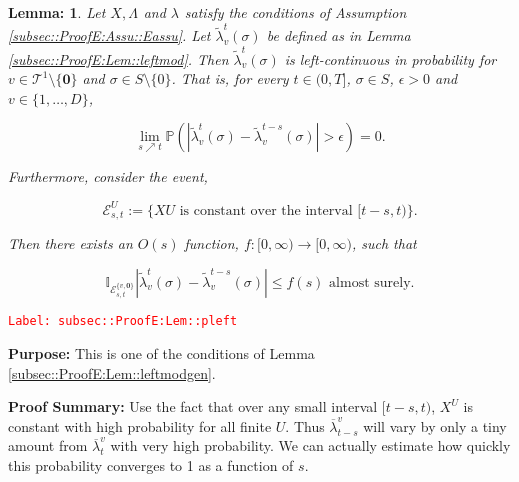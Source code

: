 \documentclass[12pt]{article}
\newcommand{\mb}{\mathbb}
\newcommand{\mc}{\mathcal}
\newcommand{\ra}{\rightarrow}
\newcommand{\ov}{\overline}
\newcommand{\te}{\text}
\newcommand{\ep}{\epsilon}
\newcommand{\tr}{\textcolor{red}}
\newcommand{\labe}[1]{\tr{\texttt{Label: #1}}}
\newcommand{\purpose}{\textbf{Purpose: }}
\newcommand{\pfsum}{\textbf{Proof Summary: }}
\newcommand{\pr}{\mb{P}}							%
\renewcommand{\root}{\mathbf{0}}				%
\renewcommand{\v}{v}							%
\renewcommand{\U}{U}							%
\renewcommand{\S}{S}							%
\newcommand{\s}{\sigma}							%
\newcommand{\T}{T}								%
\renewcommand{\t}{t}							%
\renewcommand{\tt}{s}							%
\newcommand{\X}{X}								%
\newcommand{\degr}{D}							%
\newcommand{\tree}{\mc{T}}						%
\newcommand{\sln}[1]{^{#1}}						%
\newcommand{\rate}[1]{\lambda_{#1}}					%
\newcommand{\ratee}[1]{\Lambda_{#1}}				%
\newcommand{\crate}[2]{\alt{\lambda}_{#1}^{#2}}		%
\newcommand{\alt}{\widetilde}						%
\newcommand{\evnt}{\mc{E}}						%
\newtheorem{lem}[thms]{Lemma: }
\begin{document}
\begin{lem}
Let \(\X{}{},\ratee{}{}\) and \(\rate{}\) satisfy the conditions of Assumption \ref{subsec::ProofE:Assu::Eassu}. Let \(\crate{\v}{\t}(\s)\) be defined as in Lemma \ref{subsec::ProofE:Lem::leftmod}. Then \(\crate{\v}{\t}(\s)\) is left-continuous in probability for \(\v \in \tree\sln{1}\setminus\{\root\}\) and \(\s \in \S\setminus\{0\}\). That is, for every \(\t \in (0,\T]\), \(\s \in \S\), \(\ep > 0\) and \(\v\in \{1,\dots,\degr\}\),

\[\lim_{\tt \nearrow \t}\pr\left(|\crate{\v}{\t}(\s)- \crate{\v}{\t-\tt}(\s)| > \ep\right) = 0.\]

Furthermore, consider the event,

\[\evnt^\U_{\tt,\t} := \{\X{\U}{} \te{ is constant over the interval } [\t-\tt,\t)\}.\]

Then there exists an \(O(s)\) function, \(f:[0,\infty)\ra[0,\infty)\), such that 

\[\mb{I}_{\evnt^{\{\v,\root\}}_{\tt,\t}}|\crate{\v}{\t}(\s) - \crate{\v}{\t-\tt}(\s)| \leq f(s) \te{ almost surely.}\]
\label{subsec::ProofE:Lem::pleft}
\end{lem}
\labe{subsec::ProofE:Lem::pleft}

\purpose This is one of the conditions of Lemma \ref{subsec::ProofE:Lem::leftmodgen}.

\pfsum Use the fact that over any small interval \([t-s,t)\), \(X^U\) is constant with high probability for all finite \(U\). Thus \(\ov{\lambda}^v_{t-s}\) will vary by only a tiny amount from \(\ov{\lambda}^v_t\) with very high probability. We can actually estimate how quickly this probability converges to 1 as a function of \(s\).
\end{document}
